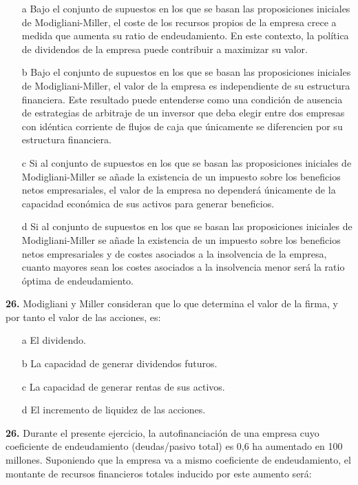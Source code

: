 \documentclass{nuevotema}
\begin{document}
\begin{enumerate}
	\item[a] Bajo el conjunto de supuestos en los que se basan las proposiciones iniciales de Modigliani-Miller, el coste de los recursos propios de la empresa crece a medida que aumenta su ratio de endeudamiento. En este contexto, la política de dividendos de la empresa puede contribuir a maximizar su valor.
	\item[b] Bajo el conjunto de supuestos en los que se basan las proposiciones iniciales de Modigliani-Miller, el valor de la empresa es independiente de su estructura financiera. Este resultado puede entenderse como una condición de ausencia de estrategias de arbitraje de un inversor que deba elegir entre dos empresas con idéntica corriente de flujos de caja que únicamente se diferencien por su estructura financiera.
	\item[c] Si al conjunto de supuestos en los que se basan las proposiciones iniciales de Modigliani-Miller se añade la existencia de un impuesto sobre los beneficios netos empresariales, el valor de la empresa no dependerá únicamente de la capacidad económica de sus activos para generar beneficios.
	\item[d] Si al conjunto de supuestos en los que se basan las proposiciones iniciales de Modigliani-Miller se añade la existencia de un impuesto sobre los beneficios netos empresariales y de costes asociados a la insolvencia de la empresa, cuanto mayores sean los costes asociados a la insolvencia menor será la ratio óptima de endeudamiento. 
	
\end{enumerate}

\textbf{26.} Modigliani y Miller consideran que lo que determina el valor de la firma, y por tanto el valor de las acciones, es:

\begin{enumerate}
	\item[a] El dividendo.
	\item[b] La capacidad de generar dividendos futuros.
	\item[c] La capacidad de generar rentas de sus activos.
	\item[d] El incremento de liquidez de las acciones.
\end{enumerate}

\textbf{26.} Durante el presente ejercicio, la autofinanciación de una empresa cuyo coeficiente de endeudamiento (deudas/pasivo total) es 0,6 ha aumentado en 100 millones. Suponiendo que la empresa va a mismo coeficiente de endeudamiento, el montante de recursos financieros totales inducido por este aumento será:
\end{document}
